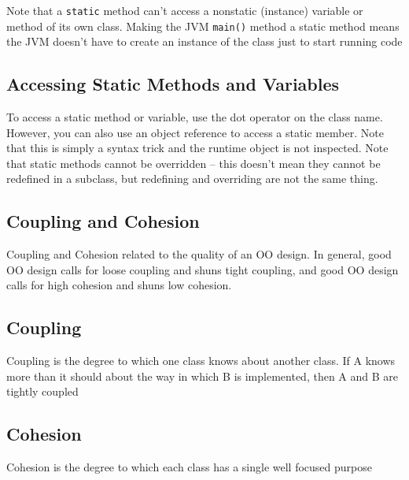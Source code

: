 Note that a \verb#static# method can't access a nonstatic (instance) variable 
or method of its own class. Making the JVM \verb#main()# method a static method 
means the JVM doesn't have to create an instance of the class just to start 
running code

\subsection{Accessing Static Methods and Variables}
To access a static method or variable, use the dot operator on the class name.  
However, you can also use an object reference to access a static member. Note 
that this is simply a syntax trick and the runtime object is not inspected.  
Note that static methods cannot be overridden -- this doesn't mean they cannot 
be redefined in a subclass, but redefining and overriding are not the same 
thing.

\subsection{Coupling and Cohesion}
Coupling and Cohesion related to the quality of an OO design. In general, good 
OO design calls for loose coupling and shuns tight coupling, and good OO design 
calls for high cohesion and shuns low cohesion.

\subsection{Coupling}
Coupling is the degree to which one class knows about another class. If A knows 
more than it should about the way in which B is implemented, then A and B are 
tightly coupled

\subsection{Cohesion}
Cohesion is the degree to which each class has a single well focused purpose
